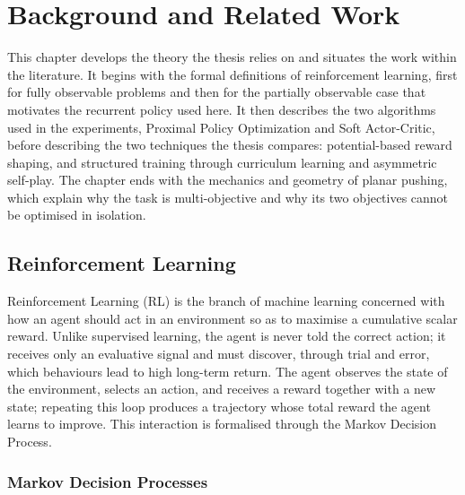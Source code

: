 \section{Background and Related Work}
\label{sec:drl_robotics}

This chapter develops the theory the thesis relies on and situates the work
within the literature. It begins with the formal definitions of
reinforcement learning, first for fully observable problems and then for the
partially observable case that motivates the recurrent policy used here. It then
describes the two algorithms used in the experiments, Proximal Policy
Optimization and Soft Actor-Critic, before describing the two techniques the
thesis compares: potential-based reward shaping, and structured training through
curriculum learning and asymmetric self-play. The chapter ends with the
mechanics and geometry of planar pushing, which explain why the task is
multi-objective and why its two objectives cannot be optimised in
isolation.

\subsection{Reinforcement Learning}

Reinforcement Learning (RL) is the branch of machine learning concerned with how
an agent should act in an environment so as to maximise a cumulative scalar
reward. Unlike supervised learning, the agent is never told the correct action;
it receives only an evaluative signal and must discover, through trial and error,
which behaviours lead to high long-term return. The agent observes the state of
the environment, selects an action, and receives a reward together with a new
state; repeating this loop produces a trajectory whose total reward the agent
learns to improve. This interaction is formalised through the Markov Decision
Process.

\subsubsection{Markov Decision Processes}

